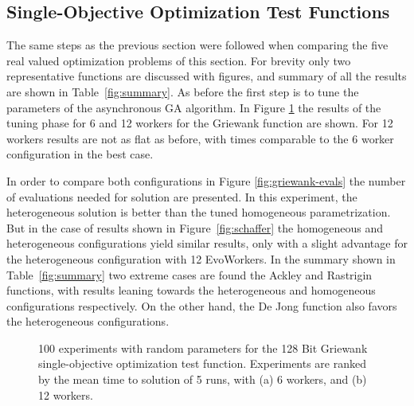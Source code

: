\documentclass{llncs}
\begin{document}
\subsection{ Single-Objective Optimization Test Functions}

The same steps as the previous section were followed when comparing the five real valued 
optimization problems of this section. For brevity only two representative functions are discussed
with figures, and summary of all the results are shown in Table~\ref{fig:summary}. As before
the first step is to tune the parameters of the 
asynchronous GA algorithm. In Figure \ref{fig:griewank} the results of the tuning 
phase for 6 and 12 workers for the Griewank function are shown. For 12 workers
results are not as flat as before, with times comparable to the 6 worker 
configuration in the best case.

In order to compare both configurations in Figure \ref{fig:griewank-evals} the number of evaluations 
needed for solution are presented. In this experiment, the heterogeneous solution is better than the
tuned homogeneous parametrization. But in the case of results shown in Figure~\ref{fig:schaffer} 
the homogeneous and heterogeneous configurations yield similar results, 
only with a slight advantage
for the heterogeneous configuration with 12 EvoWorkers. In the summary shown in
Table~\ref{fig:summary} two extreme cases are found the Ackley and Rastrigin functions, 
with results leaning
towards the heterogeneous and homogeneous configurations respectively. On the other hand, the De Jong
function also favors the heterogeneous configurations. 



\begin{figure}[b]
    \centering

    \caption{100 experiments with random parameters for the 128 Bit Griewank 
    single-objective optimization test function. Experiments are ranked by 
    the mean time to solution of 5 runs, with (a) 6 workers, and (b) 12 workers.}
    \label{fig:griewank}
\end{figure}
\end{document}
